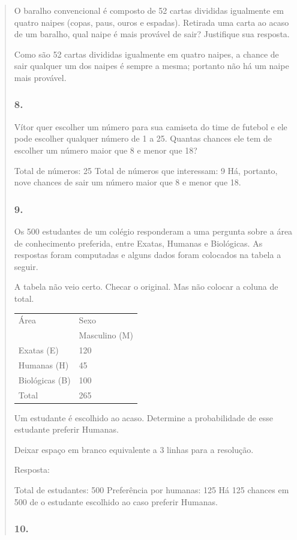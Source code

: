 \begin{enumerate}
\begin{escolha}
\begin{enumerate}
\begin{itemize}
\begin{itemize}
\begin{escolha}
\begin{quote}
\begin{escolha}
O baralho convencional é composto de 52 cartas divididas igualmente em quatro
naipes (copas, paus, ouros e espadas). Retirada uma carta ao acaso de um baralho,
qual naipe é mais provável de sair? Justifique sua resposta.

Como são 52 cartas divididas igualmente em quatro naipes, a chance de sair qualquer um dos naipes é sempre a mesma; portanto não há um naipe mais provável.

\subsubsection{8.}\label{section-85}

Vítor quer escolher um número para sua camiseta do time de futebol e ele
pode escolher qualquer número de 1 a 25. Quantas chances ele tem de
escolher um número maior que 8 e menor que 18?

Total de números: 25
Total de números que interessam: 9
Há, portanto, nove chances de sair um número maior que 8 e menor que 18.

\subsubsection{9.}\label{section-86}

Os 500 estudantes de um colégio responderam a uma pergunta sobre a
área de conhecimento preferida, entre Exatas, Humanas e
Biológicas. As respostas foram computadas e alguns dados foram colocados
na tabela a seguir.

\Paulo A tabela não veio certo. Checar o original. Mas não colocar a coluna de total.
\begin{longtable}[]{@{}ll@{}}
\toprule
Área & Sexo\tabularnewline
& Masculino (M)\tabularnewline
Exatas (E) & 120\tabularnewline
Humanas (H) & 45\tabularnewline
Biológicas (B) & 100\tabularnewline
Total & 265\tabularnewline
\bottomrule
\end{longtable}

Um estudante é escolhido ao acaso. Determine a probabilidade de esse
estudante preferir Humanas.

Deixar espaço em branco equivalente a 3 linhas para a resolução.

Resposta:

Total de estudantes: 500
Preferência por humanas: 125
Há 125 chances em 500 de o estudante escolhido ao caso preferir Humanas.

\subsubsection{10.}\label{section-87}


\end{escolha}
\end{quote}
\end{escolha}
\end{itemize}
\end{itemize}
\end{enumerate}
\end{escolha}
\end{enumerate}
